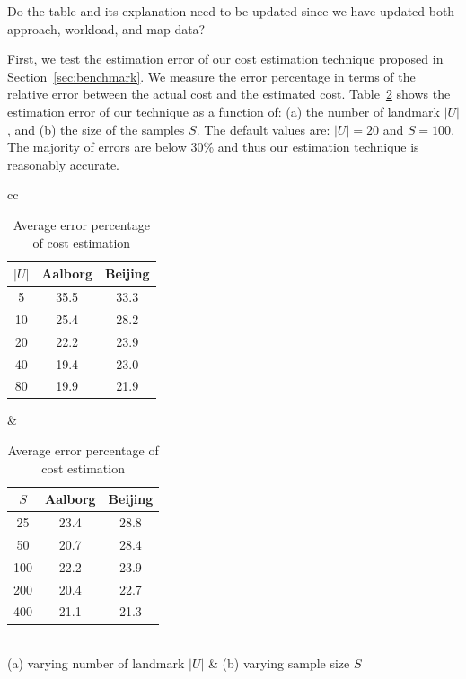 {\color{blue} Do the table and its explanation need to be updated since we have updated both approach, workload, and map data?}

First, we test the estimation error of our cost estimation technique proposed in Section~\ref{sec:benchmark}.
We measure the error percentage in terms of the relative error between the actual cost and the estimated cost.
Table~\ref{tbl:estcost} shows the estimation error of our technique
as a function of: (a) the number of landmark $|U|$, and (b) the size of the samples $S$.
The default values are: $|U|=20$ and $S=100$.
The majority of errors are below 30\% and thus our estimation technique is reasonably accurate.





\begin{table}
\center
\color{blue}
\begin{tabular}{cc}
    \begin{tabular}{|c|c|c|}
    \hline
    $|U|$ & Aalborg & Beijing \\ \hline \hline
     5 & 35.5 & 33.3 \\ \hline
     10 & 25.4 & 28.2 \\ \hline
     20 & 22.2 & 23.9 \\ \hline
     40 & 19.4 & 23.0  \\ \hline
     80 & 19.9 & 21.9 \\ \hline
    \end{tabular}
    &
    \begin{tabular}{|c|c|c|}
    \hline
    $S$ & Aalborg & Beijing \\ \hline \hline
     25 & 23.4 & 28.8 \\ \hline
     50 & 20.7 & 28.4 \\ \hline
     100 & 22.2 & 23.9 \\ \hline
     200 & 20.4 & 22.7 \\ \hline
     400 & 21.1 & 21.3 \\ \hline
    \end{tabular}
    \\
    (a) varying number of landmark $|U|$ & (b) varying sample size $S$
\end{tabular}
    \caption{Average error percentage of cost estimation}
    \label{tbl:estcost}
\end{table}








